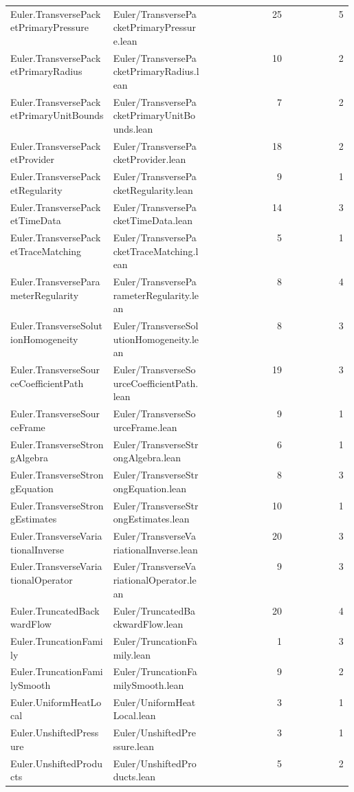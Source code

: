 \begin{longtable}{p{0.30\linewidth}p{0.28\linewidth}rr}
Euler.TransversePacketPrimaryPressure & Euler/TransversePacketPrimaryPressure.lean & 25 & 5\\
Euler.TransversePacketPrimaryRadius & Euler/TransversePacketPrimaryRadius.lean & 10 & 2\\
Euler.TransversePacketPrimaryUnitBounds & Euler/TransversePacketPrimaryUnitBounds.lean & 7 & 2\\
Euler.TransversePacketProvider & Euler/TransversePacketProvider.lean & 18 & 2\\
Euler.TransversePacketRegularity & Euler/TransversePacketRegularity.lean & 9 & 1\\
Euler.TransversePacketTimeData & Euler/TransversePacketTimeData.lean & 14 & 3\\
Euler.TransversePacketTraceMatching & Euler/TransversePacketTraceMatching.lean & 5 & 1\\
Euler.TransverseParameterRegularity & Euler/TransverseParameterRegularity.lean & 8 & 4\\
Euler.TransverseSolutionHomogeneity & Euler/TransverseSolutionHomogeneity.lean & 8 & 3\\
Euler.TransverseSourceCoefficientPath & Euler/TransverseSourceCoefficientPath.lean & 19 & 3\\
Euler.TransverseSourceFrame & Euler/TransverseSourceFrame.lean & 9 & 1\\
Euler.TransverseStrongAlgebra & Euler/TransverseStrongAlgebra.lean & 6 & 1\\
Euler.TransverseStrongEquation & Euler/TransverseStrongEquation.lean & 8 & 3\\
Euler.TransverseStrongEstimates & Euler/TransverseStrongEstimates.lean & 10 & 1\\
Euler.TransverseVariationalInverse & Euler/TransverseVariationalInverse.lean & 20 & 3\\
Euler.TransverseVariationalOperator & Euler/TransverseVariationalOperator.lean & 9 & 3\\
Euler.TruncatedBackwardFlow & Euler/TruncatedBackwardFlow.lean & 20 & 4\\
Euler.TruncationFamily & Euler/TruncationFamily.lean & 1 & 3\\
Euler.TruncationFamilySmooth & Euler/TruncationFamilySmooth.lean & 9 & 2\\
Euler.UniformHeatLocal & Euler/UniformHeatLocal.lean & 3 & 1\\
Euler.UnshiftedPressure & Euler/UnshiftedPressure.lean & 3 & 1\\
Euler.UnshiftedProducts & Euler/UnshiftedProducts.lean & 5 & 2\\

\end{longtable}
